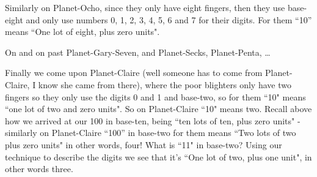 \documentclass{article}
\begin{document}
Similarly on Planet-Ocho, since they only have eight fingers,
then they use base-eight and only use numbers 0, 1,
2, 3, 4, 5, 6 and 7 for their digits. For them ``10''
means ``One lot of eight, plus zero units".

On and on past Planet-Gary-Seven, and Planet-Secks, Planet-Penta, \dots{}

Finally we come upon Planet-Claire (well someone
has to come from Planet-Claire,
I know she came from there),
where the poor blighters only have two fingers
so they only use the digits 0 and 1 and base-two,
so for them ``10" means ``one lot of two and zero units".
So on Planet-Claire ``10" means two.
Recall above how we arrived at our 100 in base-ten,
being ``ten lots of ten,
plus zero units" - similarly on Planet-Claire ``100''
in base-two for them means ``Two lots of two plus zero units" in other words,
four! What is ``11" in base-two? Using our technique to
describe the digits we see that it's ``One lot of two, plus one unit",
in other words three.
\end{document}

